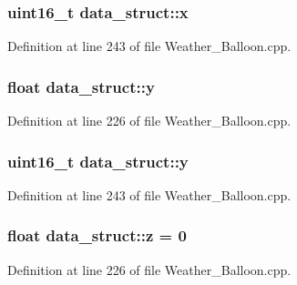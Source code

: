 \subsubsection[{\texorpdfstring{x}{x}}]{\setlength{\rightskip}{0pt plus 5cm}uint16\+\_\+t data\+\_\+struct\+::x}\hypertarget{structdata__struct_a11ce2a30e7dc48b21b7f06b4bb6e4ed7}{}\label{structdata__struct_a11ce2a30e7dc48b21b7f06b4bb6e4ed7}


Definition at line 243 of file Weather\+\_\+\+Balloon.\+cpp.

\subsubsection[{\texorpdfstring{y}{y}}]{\setlength{\rightskip}{0pt plus 5cm}float data\+\_\+struct\+::y}\hypertarget{structdata__struct_a907e433dba309a2e973da7f346b8d619}{}\label{structdata__struct_a907e433dba309a2e973da7f346b8d619}


Definition at line 226 of file Weather\+\_\+\+Balloon.\+cpp.

\subsubsection[{\texorpdfstring{y}{y}}]{\setlength{\rightskip}{0pt plus 5cm}uint16\+\_\+t data\+\_\+struct\+::y}\hypertarget{structdata__struct_a7555c56e9ddf0a0f0f9a29410f221dec}{}\label{structdata__struct_a7555c56e9ddf0a0f0f9a29410f221dec}


Definition at line 243 of file Weather\+\_\+\+Balloon.\+cpp.

\subsubsection[{\texorpdfstring{z}{z}}]{\setlength{\rightskip}{0pt plus 5cm}float data\+\_\+struct\+::z = 0}\hypertarget{structdata__struct_a99537ca31fb73ac23386af3748921b53}{}\label{structdata__struct_a99537ca31fb73ac23386af3748921b53}


Definition at line 226 of file Weather\+\_\+\+Balloon.\+cpp.

